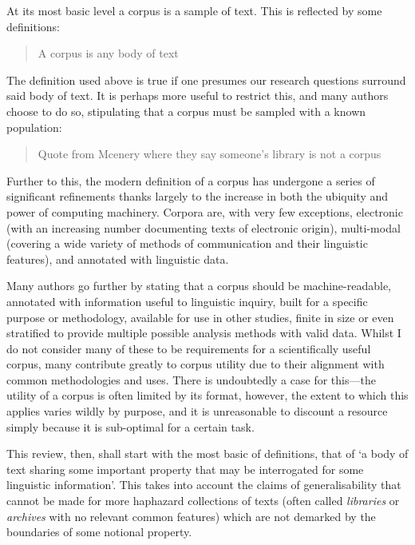 At its most basic level a corpus is a sample of text.  This is reflected by some definitions:

\begin{quote}
A corpus is any body of text
\end{quote}

The definition used above is true if one presumes our research questions surround said body of text.  It is perhaps more useful to restrict this, and many authors choose to do so, stipulating that a corpus must be sampled with a known population:

\begin{quote}
Quote from Mcenery where they say someone's library is not a corpus
\end{quote}


Further to this, the modern definition of a corpus has undergone a series of significant refinements thanks largely to the increase in both the ubiquity and power of computing machinery.  Corpora are, with very few exceptions, electronic (with an increasing number documenting texts of electronic origin), multi-modal (covering a wide variety of methods of communication and their linguistic features), and annotated with linguistic data.

Many authors go further by stating that a corpus should be machine-readable, annotated with information useful to linguistic inquiry, built for a specific purpose or methodology, available for use in other studies, finite in size or even stratified to provide multiple possible analysis methods with valid data.  Whilst I do not consider many of these to be requirements for a scientifically useful corpus, many contribute greatly to corpus utility due to their alignment with common methodologies and uses.  There is undoubtedly a case for this---the utility of a corpus is often limited by its format, however, the extent to which this applies varies wildly by purpose, and it is unreasonable to discount a resource simply because it is sub-optimal for a certain task.


This review, then, shall start with the most basic of definitions, that of `a body of text sharing some important property that may be interrogated for some linguistic information'.  This takes into account the claims of generalisability that cannot be made for more haphazard collections of texts (often called \textsl{libraries} or \textsl{archives} with no relevant common features) which are not demarked by the boundaries of some notional property.









